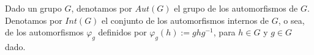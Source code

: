 \question 
Dado un grupo $G$, denotamos por $Aut(G)$ el grupo de los automorfismos de $G$. Denotamos por $Int(G)$ el conjunto de los automorfismos internos de $G$, o sea, de los automorfismos $\varphi_g$ definidos por $\varphi_g(h):=ghg^{-1}$, para $h \in G$ y $g \in G$ dado.
